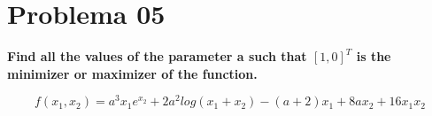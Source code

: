 \section*{Problema 05}

\textbf{Find all the values of the parameter a such that $[1, 0]^T$ is the minimizer or maximizer of the function.}

\begin{equation*}
    f(x_1,x_2) = a^3x_1 e^{x_2} +2a^2log(x_1+x_2)-(a+2)x_1 +8ax_2 +16x_1x_2
\end{equation*}
